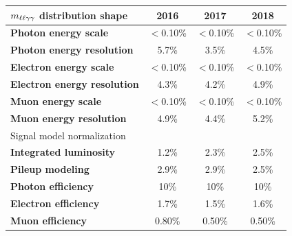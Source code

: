 \begin{table} [hbtp]
    \centering
        \begin{tabular}{lccc}
        $m_{\ell\ell\gamma\gamma}$ distribution shape & 2016 & 2017 & 2018  \\
        \hline
        \textbf{Photon energy scale} & $<$0.10\% & $<$0.10\% & $<$0.10\% \\
        \textbf{Photon energy resolution} & 5.7\% & 3.5\% & 4.5\% \\
        \textbf{Electron energy scale} & $<$0.10\% & $<$0.10\% & $<$0.10\% \\ 
        \textbf{Electron energy resolution} & 4.3\% & 4.2\% & 4.9\% \\ 
        \textbf{Muon energy scale} & $<$0.10\% & $<$0.10\% & $<$0.10\% \\
        \textbf{Muon energy resolution}  & 4.9\% & 4.4\% & 5.2\% \\ 
        \hline
        Signal model normalization &  &  &  \\
        \hline
        \textbf{Integrated luminosity} & 1.2\% & 2.3\% & 2.5\% \\
        \textbf{Pileup modeling} & 2.9\% & 2.9\% & 2.5\% \\
        \textbf{Photon efficiency} & 10\% & 10\% & 10\% \\
        \textbf{Electron efficiency} & 1.7\% & 1.5\% & 1.6\% \\
        \textbf{Muon efficiency} & 0.80\% & 0.50\% & 0.50\% \\

        \end{tabular}
    \label{tab:systematics}
\end{table}

